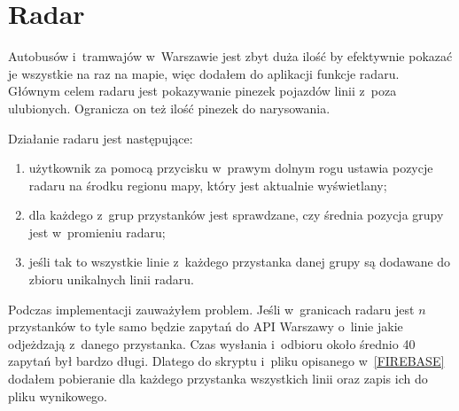 \documentclass{SGGW-thesis}
\begin{document}
\label{RADAR}
\section{Radar}
Autobusów i~tramwajów w~Warszawie jest zbyt duża ilość by efektywnie pokazać je wszystkie na raz na mapie, więc dodałem do aplikacji funkcje radaru.
Głównym celem radaru jest pokazywanie pinezek pojazdów linii z~poza ulubionych.
Ogranicza on też ilość pinezek do narysowania.

Działanie radaru jest następujące:
\begin{enumerate}
  \item{użytkownik za pomocą przycisku w~prawym dolnym rogu ustawia pozycje radaru na środku regionu mapy, który jest aktualnie wyświetlany;}
  \item{dla każdego z~grup przystanków jest sprawdzane, czy średnia pozycja grupy jest w~promieniu radaru;}
  \item{jeśli tak to wszystkie linie z~każdego przystanka danej grupy są dodawane do zbioru unikalnych linii radaru.}
\end{enumerate}
Podczas implementacji zauważyłem problem.
Jeśli w~granicach radaru jest $n$ przystanków to tyle samo będzie zapytań do API Warszawy o~linie jakie odjeżdzają z~danego przystanka.
Czas wysłania i~odbioru około średnio 40 zapytań był bardzo długi.
Dlatego do skryptu i~pliku opisanego w~\ref{FIREBASE} dodałem pobieranie dla każdego przystanka wszystkich linii oraz zapis ich do pliku wynikowego.
\end{document}
